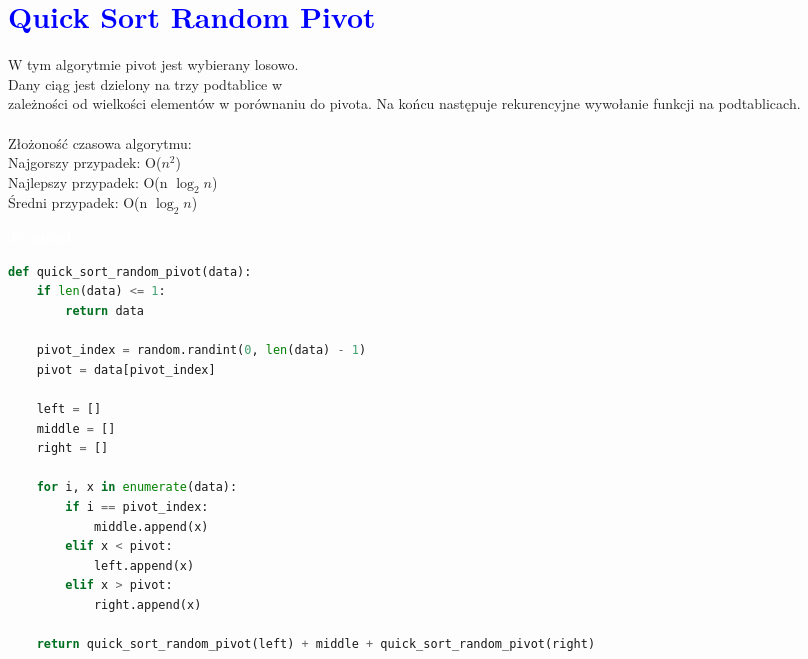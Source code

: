 \documentclass{article}
\begin{document}
	\section*{\textcolor{blue}{Quick Sort Random Pivot}}
	\begin{multicols}{2}
		\noindent W tym algorytmie pivot jest wybierany losowo. \\Dany ciąg jest dzielony na trzy podtablice w \\zależności od wielkości elementów w porównaniu do pivota. Na końcu następuje rekurencyjne wywołanie funkcji na podtablicach.\\
		\\Złożoność czasowa algorytmu: \\ Najgorszy przypadek: O($n^2$) \\Najlepszy przypadek: O(n $\log_2 n$) \\ Średni przypadek: O(n $\log_2 n$)
		
		\noindent 
		\begin{tcolorbox}[colback=black,colframe=gray!50!,arc=3mm,boxrule=0pt,left=0pt,right=0pt,width=\linewidth]
			\textcolor{white}{\textbf{\textsf{Terminal}}}\\
			
			\begin{lstlisting}[language=Python]
def quick_sort_random_pivot(data):
	if len(data) <= 1:
		return data

	pivot_index = random.randint(0, len(data) - 1)
	pivot = data[pivot_index]

	left = []
	middle = []
	right = []

	for i, x in enumerate(data):
		if i == pivot_index:
			middle.append(x)
		elif x < pivot:
			left.append(x)
		elif x > pivot:
			right.append(x)

	return quick_sort_random_pivot(left) + middle + quick_sort_random_pivot(right)

			\end{lstlisting}
			
		\end{tcolorbox}
	\end{multicols}
	
	\newpage
	
	
\end{document}
